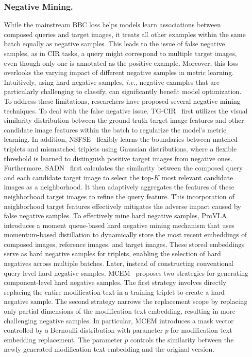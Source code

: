 \subsubsection{Negative Mining.}
While the mainstream BBC loss helps models learn associations between composed queries and target images, it treats all other examples within the same batch equally as negative samples. This leads to the issue of false negative samples, as in CIR tasks, a query might correspond to multiple target images, even though only one is annotated as the positive example. 
Moreover, this loss overlooks the varying impact of different negative samples in metric learning. Intuitively, using hard negative samples, \textit{i.e.}, negative examples that are particularly challenging to classify, can significantly benefit model optimization. To address these limitations, researchers have proposed several negative mining techniques.
To deal with the false negative issue, TG-CIR~\cite{wen2023tgcir} first utilizes the visual similarity distribution between the ground-truth target image features and other candidate image features within the batch to regularize the model's metric learning. In addition, NSFSE~\cite{wang2024NSFSE} flexibly learns the boundaries between matched triplets and mismatched triplets using Gaussian distributions, where a flexible threshold is learned to distinguish positive target images from negative ones. 
Furthermore, SADN~\cite{wang2024sadn} first calculates the similarity between the composed query and each candidate target image to select the top-$K$ most relevant candidate images as a neighborhood. It then adaptively aggregates the features of these neighborhood target images to refine the query feature. This incorporation of neighborhood target features effectively mitigates the adverse impact caused by false negative samples. 
To effectively mine hard negative samples, ProVLA~\cite{hu2023provla} introduces a moment queue-based hard negative mining mechanism that uses momentum-based distillation to dynamically store the most recent embeddings of composed images, reference images, and target images. These stored embeddings serve as hard negative samples for triplets, enabling the selection of hard negatives across multiple batches.
Later, instead of constructing conventional query-level hard negative samples, MCEM~\cite{zhang2024mcem} proposes two strategies for generating component-level hard negative samples. The first strategy involves directly replacing the entire modification text in a training triplet to create a hard negative sample. The second strategy narrows the replacement scope by replacing only partial dimensions of the modification text embedding, resulting in more challenging negative samples.
In particular, MCEM introduces a mask vector controlled by a Bernoulli distribution with parameter $p$ for modification text embedding replacement. The parameter $p$ controls the similarity between the newly generated modification text embedding and the original version. 

